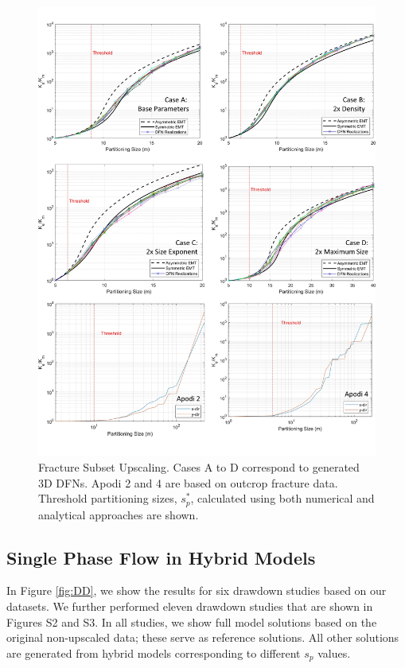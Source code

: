 \documentclass[draft]{agujournal2018}
\begin{document}
\begin{figure}[h]
 \centering

 \includegraphics[width=\textwidth]{FSU_main_V.jpg}

 \caption{Fracture Subset Upscaling. Cases A to D correspond to generated 3D DFNs. Apodi 2 and 4 are based on outcrop fracture data. Threshold partitioning sizes, $s_p^*$, calculated using both numerical and analytical approaches are shown.}
 \label{fig:FSU}
\end{figure}

\subsection{Single Phase Flow in Hybrid Models}
In Figure \ref{fig:DD}, we show the results for six drawdown studies based on our datasets. We further performed eleven drawdown studies that are shown in Figures S2 and S3. In all studies, we show full model solutions based on the original non-upscaled data; these serve as reference solutions. All other solutions are generated from hybrid models corresponding to different $s_p$ values. 
\end{document}
